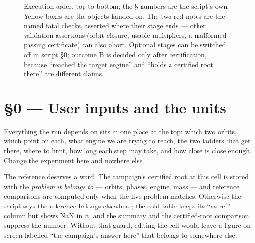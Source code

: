 \documentclass[11pt]{article}
\begin{document}
\begin{figure}[!tbp]
\caption{Execution order, top to bottom; the \S{} numbers are the script's
own. Yellow boxes are the objects handed on. The two red notes are the
named fatal checks, asserted where their stage ends --- other validation
assertions (orbit closure, usable multipliers, a malformed passing
certificate) can also abort. Optional stages can be switched off in script
\S0; outcome B is decided only after certification, because ``reached the
target engine'' and ``holds a certified root there'' are different claims.}
\end{figure}

\section{\S0 --- User inputs and the units}\label{sec:inputs}

\begin{eli}
Everything the run depends on sits in one place at the top: which two
orbits, which point on each, what engine we are trying to reach, the two
ladders that get there, where to hunt, how long each step may take, and how
close is close enough. Change the experiment here and nowhere else.
\end{eli}

\begin{intu}
The reference deserves a word. The campaign's certified root at this cell
is stored with the \emph{problem it belongs to} --- orbits, phases, engine,
mass --- and reference comparisons are computed only when the live problem
matches. Otherwise the script says the reference belongs elsewhere; the cold
table keeps its ``vs ref'' column but shows NaN in it, and the summary and
the certified-root comparison suppress the number. Without that guard,
editing the cell would leave a figure on screen labelled ``the campaign's
answer here'' that belongs to somewhere else.
\end{intu}
\end{document}
